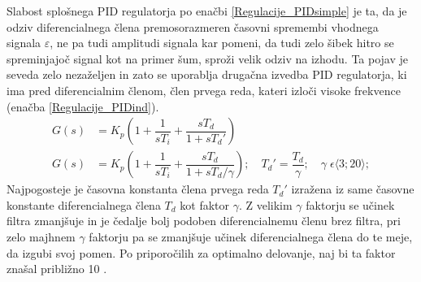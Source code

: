\documentclass[a4paper,twoside,openright,12pt]{book}
\begin{document}
 Slabost splošnega PID regulatorja po enačbi \ref{Regulacije_PIDsimple} je ta, da je odziv diferencialnega člena premosorazmeren časovni spremembi vhodnega signala $\varepsilon$, ne pa tudi amplitudi signala kar pomeni, da tudi zelo šibek hitro se spreminjajoč signal kot na primer šum, sproži velik odziv na izhodu. Ta pojav je seveda zelo nezaželjen in zato se uporablja drugačna izvedba PID regulatorja, ki ima pred diferencialnim členom, člen prvega reda, kateri izloči visoke frekvence (enačba \ref{Regulacije_PIDind}).\\
\begin{equation} \label{Regulacije_PIDind}
\begin{aligned}
G(s) & = K_p(1+\dfrac{1}{sT_i}+ \dfrac{sT_d}{1+sT_d'})\\
G(s) & = K_p(1+\dfrac{1}{sT_i}+ \dfrac{sT_d}{1+sT_d/\gamma});\quad T_d'=\dfrac{T_d}{\gamma};\quad \gamma\;\epsilon\langle3;20\rangle;
\end{aligned}
\end{equation}
Najpogosteje je časovna konstanta člena prvega reda $T_d'$ izražena iz same časovne konstante diferencialnega člena $T_d$ kot faktor $\gamma$. Z velikim  $\gamma$ faktorju se učinek filtra zmanjšuje in je čedalje bolj podoben diferencialnemu členu brez filtra, pri zelo majhnem $\gamma$ faktorju pa se zmanjšuje učinek diferencialnega člena do te meje, da izgubi svoj pomen. Po priporočilih za optimalno delovanje, naj bi ta faktor znašal približno 10 \cite{bobal2006digital}.
\end{document}
